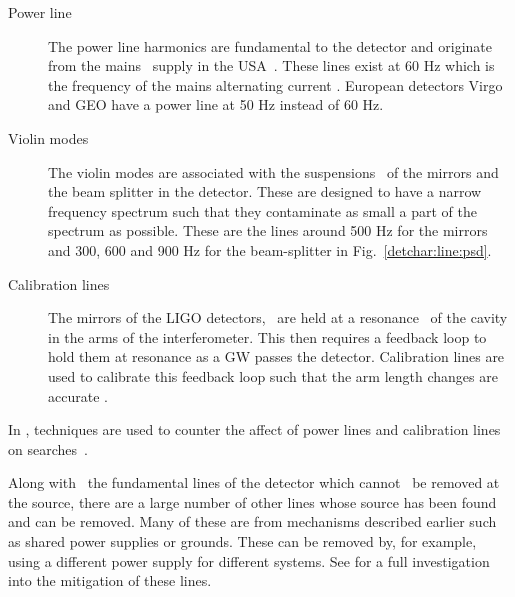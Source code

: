 \begin{description}
	\item[Power line] The power line harmonics are fundamental to the
detector and originate from the mains~ supply in the
USA~. These lines exist at 60 Hz which is the frequency of the
mains alternating current \citep{aasi2015CharacterizationLIGO}.  European
detectors Virgo and GEO have a power line at 50 Hz instead of 60 Hz.
	
        \item[Violin modes] The violin modes are associated with the
suspensions~\chris{} of the mirrors and the beam splitter in the detector. These are
designed to have a narrow frequency spectrum such that they contaminate as
small a part of the spectrum as possible. These are the lines around 500 Hz for
the mirrors and 300, 600 and 900 Hz for the beam-splitter \citep{GWOpen} in
Fig.~\ref{detchar:line:psd}.
	
        \item[Calibration lines] The mirrors of the \gls{LIGO}
detectors,~ are
held at a resonance~ of the cavity in the arms of the interferometer. This then
requires a feedback loop to hold them at resonance as a \gls{GW} passes the
detector. Calibration lines are used to calibrate this feedback loop such that
the arm length changes are accurate
\citep{tuyenbayev2016ImprovingLIGO,coughlin2010NoiseLine}.~  
\end{description}
In \citep{davis2019ImprovingSensitivity}, techniques are used to counter the
affect of power lines and calibration lines on searches~. 

Along with~ the fundamental lines of the detector which
cannot~ be
removed at the source, there are a large number of other lines whose source has
been found and can be removed.  Many of these are from mechanisms described
earlier such as shared power supplies or grounds. These can be removed by, for
example, using a different power supply for different systems. See
\citep{covas2018IdentificationMitigation} for a full investigation into the
mitigation of these lines.

